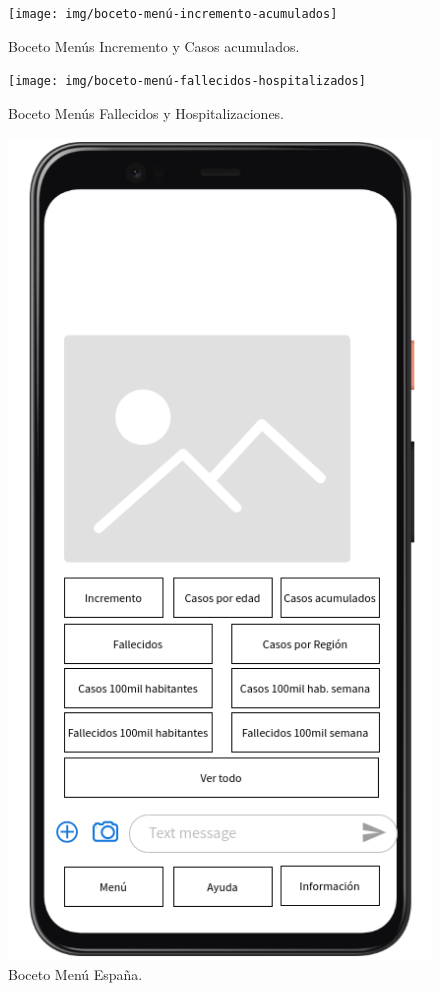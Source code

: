 \begin{figure}[p]
	\centering
	\texttt{[image: img/boceto-menú-incremento-acumulados]}
	\caption{Boceto Menús Incremento y Casos acumulados.}
	\label{fig:boceto4}
\end{figure}

\begin{figure}[p]
	\centering
	\texttt{[image: img/boceto-menú-fallecidos-hospitalizados]}
	\caption{Boceto Menús Fallecidos y Hospitalizaciones.}
	\label{fig:boceto5}
\end{figure}

\begin{figure}[p]
	\centering
	\includegraphics[width=1.1\textwidth]{img/boceto-menú-españa}
	\caption{Boceto Menú España.}
	\label{fig:boceto6}
\end{figure}

